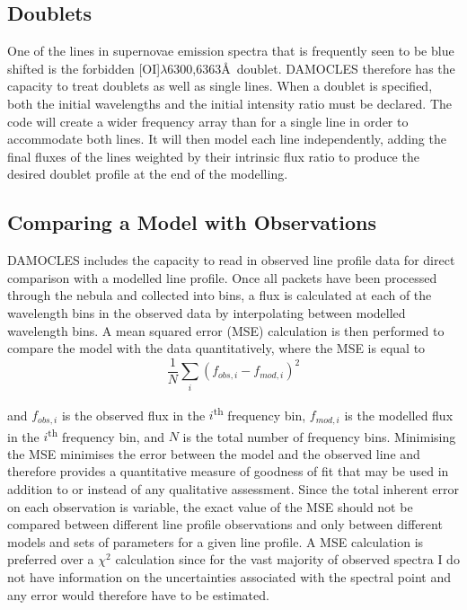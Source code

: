         \subsection{Doublets}

        One of the lines in supernovae emission spectra that is frequently seen to be blue shifted is the forbidden [OI]$\lambda$6300,6363\AA\ doublet.  DAMOCLES therefore has the capacity to treat doublets as well as single lines.  When a doublet is specified, both the initial wavelengths and the initial intensity ratio must be declared.  The code will create a wider frequency array than for a single line in order to accommodate both lines.  It will then model each line independently, adding the final fluxes of the lines weighted by their intrinsic flux ratio to produce the desired doublet profile at the end of the modelling. 

        \subsection{Comparing a Model with Observations}

        DAMOCLES includes the capacity to read in observed line profile data for direct comparison with a modelled line profile.  Once all packets have been processed through the nebula and collected into bins, a flux is calculated at each of the wavelength bins in the observed data by interpolating between modelled wavelength bins.  A mean squared error (MSE) calculation is then performed to compare the model with the data quantitatively, where the MSE is equal to	
        \begin{equation}
        \label{eqn:chi2}
        \frac{1}{N} \sum_i (f_{obs,i}- f_{mod,i})^2
        \end{equation}		
        
        \noindent and $f_{obs,i}$ is the observed flux in the $i$\textsuperscript{th} frequency bin, $f_{mod,i}$ is the modelled flux in the $i$\textsuperscript{th} frequency bin, and $N$ is the total number of frequency bins.   Minimising the MSE minimises the error between the model and the observed line and therefore provides a quantitative measure of goodness of fit that may be used in addition to or instead of any qualitative assessment.  Since the total inherent error on each observation is variable, the exact value of the MSE should not be compared between different line profile observations and only between different models and sets of parameters for a given line profile.  A MSE calculation is preferred over a $\chi^2$ calculation since for the vast majority of observed spectra I do not have information on the uncertainties associated with the spectral point and any error would therefore have to be estimated.
        
